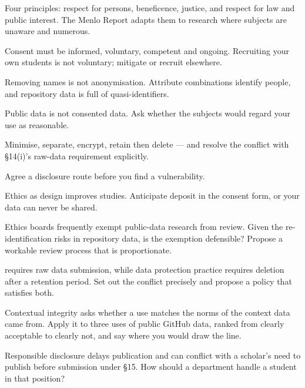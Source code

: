 \begin{chaptersummary}
\begin{tight}
  \item Four principles: respect for persons, beneficence, justice, and respect
    for law and public interest. The Menlo Report adapts them to research where
    subjects are unaware and numerous.
  \item Consent must be informed, voluntary, competent and ongoing. Recruiting
    your own students is not voluntary; mitigate or recruit elsewhere.
  \item Removing names is not anonymisation. Attribute combinations identify
    people, and repository data is full of quasi-identifiers.
  \item Public data is not consented data. Ask whether the subjects would
    regard your use as reasonable.
  \item Minimise, separate, encrypt, retain then delete --- and resolve the
    conflict with \S14(i)'s raw-data requirement explicitly.
  \item Agree a disclosure route before you find a vulnerability.
  \item Ethics as design improves studies. Anticipate deposit in the consent
    form, or your data can never be shared.
\end{tight}
\end{chaptersummary}

\begin{reviewq}
  \item Ethics boards frequently exempt public-data research from review. Given
    the re-identification risks in repository data, is the exemption defensible?
    Propose a workable review process that is proportionate.
  \item {} requires raw data submission, while data
    protection practice requires deletion after a retention period. Set out the
    conflict precisely and propose a policy that satisfies both.
  \item Contextual integrity asks whether a use matches the norms of the context
    data came from. Apply it to three uses of public GitHub data, ranked from
    clearly acceptable to clearly not, and say where you would draw the line.
  \item Responsible disclosure delays publication and can conflict with a
    scholar's need to publish before submission under \S15. How should a
    department handle a student in that position?
\end{reviewq}
